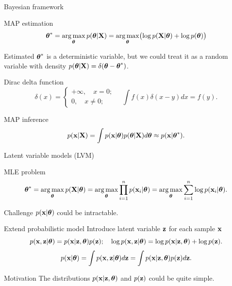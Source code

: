 \begin{frame}{Bayesian framework}
	\begin{block}{MAP estimation}
		\vspace{-0.2cm}
		\[
		\boldsymbol{\theta}^* = \operatorname*{arg\,max}_{\boldsymbol{\theta}} p(\boldsymbol{\theta} | \mathbf{X}) = \operatorname*{arg\,max}_{\boldsymbol{\theta}} \bigl(\log p(\mathbf{X} | \boldsymbol{\theta}) + \log p(\boldsymbol{\theta}) \bigr)
		\]
	\end{block}
	Estimated $\boldsymbol{\theta}^*$ is a deterministic variable, but we could treat it as a random variable with density $p(\boldsymbol{\theta} | \mathbf{X}) = \delta(\boldsymbol{\theta} - \boldsymbol{\theta}^*)$.
	\begin{block}{Dirac delta function}
		\[
			\delta(x) = 
			\begin{cases}
				+\infty, \quad x = 0; \\
				0, \quad x \neq 0;
			\end{cases} \quad 
			\int f(x) \delta (x - y) dx = f(y).
		\]
	\end{block}
	\begin{block}{MAP inference}
		\[
			p(\mathbf{x} | \mathbf{X}) = \int p(\mathbf{x}| \boldsymbol{\theta}) p(\boldsymbol{\theta} | \mathbf{X} ) d \boldsymbol{\theta} \approx p(\mathbf{x} | \boldsymbol{\theta}^*).
		\]
	\end{block}
\end{frame}
\begin{frame}{Latent variable models (LVM)}
    \begin{block}{MLE problem}
    \vspace{-0.5cm}
    \[
        \boldsymbol{\theta}^* = \operatorname*{arg\,max}_{\boldsymbol{\theta}} p(\mathbf{X} | \boldsymbol{\theta}) = \operatorname*{arg\,max}_{\boldsymbol{\theta}} \prod_{i=1}^n p(\mathbf{x}_i | \boldsymbol{\theta}) = \operatorname*{arg\,max}_{\boldsymbol{\theta}} \sum_{i=1}^n \log p(\mathbf{x}_i | \boldsymbol{\theta}).
    \]
    \vspace{-0.5cm}
    \end{block}
    \begin{block}{Challenge}
    $p(\mathbf{x} | \boldsymbol{\theta})$ could be intractable.
    \end{block}
    \begin{block}{Extend probabilistic model}
    Introduce latent variable $\mathbf{z}$ for each sample $\mathbf{x}$
    \[
        p(\mathbf{x}, \mathbf{z} | \boldsymbol{\theta}) = p(\mathbf{x} | \mathbf{z}, \boldsymbol{\theta}) p(\mathbf{z}); \quad 
        \log p(\mathbf{x}, \mathbf{z} | \boldsymbol{\theta}) = \log p(\mathbf{x} | \mathbf{z}, \boldsymbol{\theta}) + \log p(\mathbf{z}).
    \]
    \[
        p(\mathbf{x} | \boldsymbol{\theta}) = \int p(\mathbf{x}, \mathbf{z} | \boldsymbol{\theta}) d\mathbf{z} = \int p(\mathbf{x} | \mathbf{z}, \boldsymbol{\theta}) p(\mathbf{z}) d\mathbf{z}.
    \]
    \end{block}
	\vspace{-0.3cm}
	\begin{block}{Motivation}
		The distributions $p(\mathbf{x} | \mathbf{z}, \boldsymbol{\theta})$ and $p(\mathbf{z})$ could be quite simple.
	\end{block}
\end{frame}

